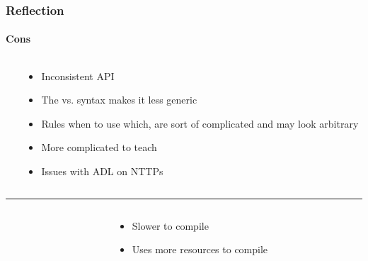 \documentclass[compress,table,xcolor=table]{beamer}
\begin{document}
\begin{frame}
  \frametitle{Reflection}
  \framesubtitle{Cons}
  \begin{columns}
    \begin{column}{.05\textwidth}
    \end{column}
    \begin{column}{.85\textwidth}
    \large
    \begin{itemize}
      \item Inconsistent API
      \item The  vs.  syntax
        makes it less generic
      \item Rules when to use which, are sort of complicated and may look arbitrary
      \item More complicated to teach
      \item Issues with ADL on NTTPs
    \end{itemize}
    \end{column}
  \end{columns}
  \vfill
  \hrule
  \vfill
  \begin{columns}
    \begin{column}{.05\textwidth}
    \end{column}
    \begin{column}{.85\textwidth}
    \large
    \begin{itemize}
      \item Slower to compile
      \item Uses more resources to compile
    \end{itemize}
    \end{column}
  \end{columns}
\end{frame}
\end{document}

